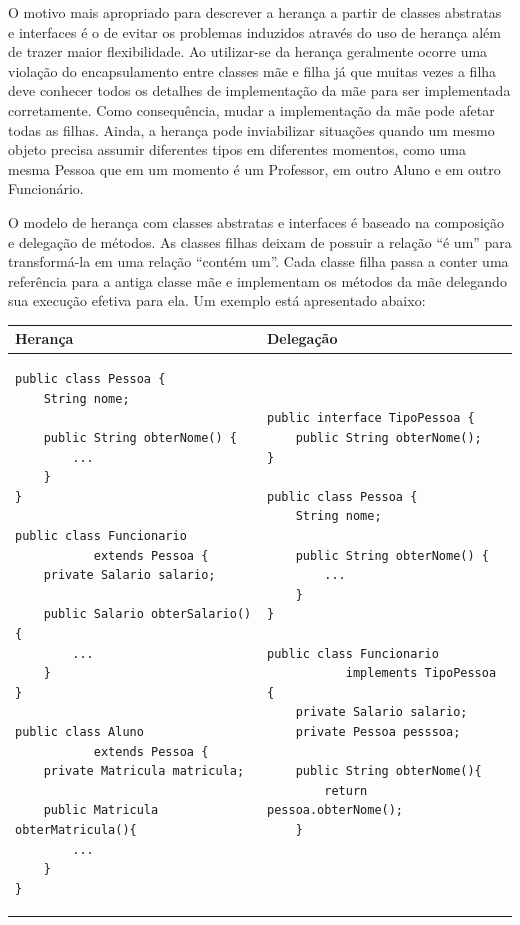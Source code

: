 \documentclass[11pt]{article}
\begin{document}
\begin{itemize}
\begin{itemize}
O motivo mais apropriado para descrever a herança a partir de classes abstratas
e interfaces é o de evitar os problemas induzidos através do uso de herança além
de trazer maior flexibilidade. Ao utilizar-se da herança geralmente ocorre uma
violação do encapsulamento entre classes mãe e filha já que muitas vezes a filha
deve conhecer todos os detalhes de implementação da mãe para ser implementada
corretamente. Como consequência, mudar a implementação da mãe pode afetar todas
as filhas. Ainda, a herança pode inviabilizar situações quando um mesmo objeto
precisa assumir diferentes tipos em diferentes momentos, como uma mesma Pessoa
que em um momento é um Professor, em outro Aluno e em outro Funcionário.

O modelo de herança com classes abstratas e interfaces é baseado na composição e 
delegação de métodos. As classes filhas deixam de possuir a relação ``é um'' para
transformá-la em uma relação ``contém um''. Cada classe filha passa a conter uma
referência para a antiga classe mãe e implementam os métodos da mãe delegando
sua execução efetiva para ela. Um exemplo está apresentado abaixo:

    \begin{tabular}{|p{0.5\linewidth}|p{0.5\linewidth}|} \hline
    Herança & Delegação \\ \hline
    \begin{verbatim}
public class Pessoa {
    String nome;
    
    public String obterNome() {
        ...
    } 
}

public class Funcionario
           extends Pessoa {
    private Salario salario;
    
    public Salario obterSalario(){
        ...
    }   
}

public class Aluno
           extends Pessoa {
    private Matricula matricula;
    
    public Matricula obterMatricula(){
        ...
    }   
}
    \end{verbatim}
    &
    \begin{verbatim}
public interface TipoPessoa {
    public String obterNome();
}

public class Pessoa {
    String nome;
    
    public String obterNome() { 
        ...
    } 
}

public class Funcionario
           implements TipoPessoa {
    private Salario salario;
    private Pessoa pesssoa;
    
    public String obterNome(){
        return pessoa.obterNome();
    }
    

\end{verbatim}
\end{tabular}
\end{itemize}
\end{itemize}
\end{document}

